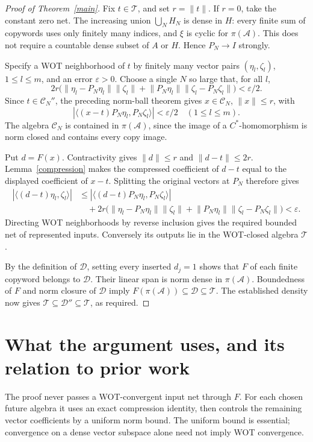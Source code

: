 \documentclass[11pt]{article}
\newcommand{\A}{\mathcal A}
\newcommand{\T}{\mathcal T}
\newcommand{\D}{\mathcal D}
\newcommand{\C}{\mathcal C}
\newcommand{\norm}[1]{\lVert#1\rVert}
\begin{document}
\begin{proof}[Proof of Theorem~\ref{main}]
Fix \(t\in\T\), and set \(r=\norm t\). If \(r=0\), take the constant
zero net. The increasing union \(\bigcup_N H_N\) is dense in \(H\):
every finite sum of copywords uses only finitely many indices, and
\(\xi\) is cyclic for \(\pi(\A)\). This does not require a countable
dense subset of \(A\) or \(H\). Hence \(P_N\to I\) strongly.

Specify a WOT neighborhood of \(t\) by finitely many vector pairs
\((\eta_l,\zeta_l)\), \(1\leq l\leq m\), and an error \(\varepsilon>0\).
Choose a single \(N\) so large that, for all \(l\),
\begin{equation}\label{vectors}
 2r\bigl(\norm{\eta_l-P_N\eta_l}\norm{\zeta_l}
       +\norm{P_N\eta_l}\norm{\zeta_l-P_N\zeta_l}\bigr)
       <\varepsilon/2 .
\end{equation}
Since \(t\in\C_N''\), the preceding norm-ball theorem gives
\(x\in\C_N\), \(\norm x\leq r\), with
\[
 |\langle(x-t)P_N\eta_l,P_N\zeta_l\rangle|<\varepsilon/2
       \quad(1\leq l\leq m).
\]
The algebra \(\C_N\) is contained in \(\pi(\A)\), since the image of a
\(C^*\)-homomorphism is norm closed and contains every copy image.

Put \(d=F(x)\). Contractivity gives \(\norm d\leq r\) and
\(\norm{d-t}\leq2r\). Lemma~\ref{compression} makes the compressed
coefficient of \(d-t\) equal to the displayed coefficient of \(x-t\).
Splitting the original vectors at \(P_N\) therefore gives
\begin{align*}
 |\langle(d-t)\eta_l,\zeta_l\rangle|
 &\leq|\langle(d-t)P_N\eta_l,P_N\zeta_l\rangle|\\
 &\quad+2r\bigl(\norm{\eta_l-P_N\eta_l}\norm{\zeta_l}
       +\norm{P_N\eta_l}\norm{\zeta_l-P_N\zeta_l}\bigr)
 <\varepsilon .
\end{align*}
Directing WOT neighborhoods by reverse inclusion gives the required
bounded net of represented inputs. Conversely its outputs lie in the
WOT-closed algebra \(\T\).

By the definition of \(\D\), setting every inserted \(d_j=1\) shows
that \(F\) of each finite copyword belongs to \(\D\).
Their linear span is norm dense in \(\pi(\A)\). Boundedness of \(F\)
and norm closure of \(\D\) imply \(F(\pi(\A))\subseteq\D\subseteq\T\).
The established density now gives
\(\T\subseteq\D''\subseteq\T\), as required.
\end{proof}

\section{What the argument uses, and its relation to prior work}
The proof never passes a WOT-convergent input net through \(F\).
For each chosen future algebra it uses an exact compression identity,
then controls the remaining vector coefficients by a uniform norm bound.
The uniform bound is essential; convergence on a dense vector subspace
alone need not imply WOT convergence.
\end{document}
